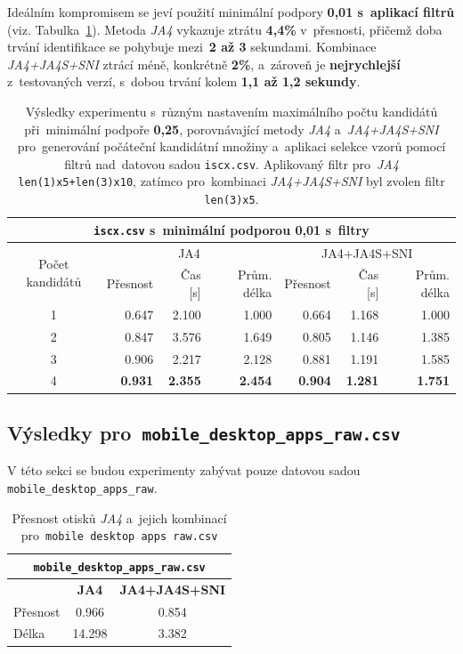 Ideálním kompromisem se jeví použití minimální podpory \textbf{0,01 s~aplikací filtrů} (viz. Tabulka~\ref{tab:iscx_sup_01_filters}). Metoda \textit{JA4} vykazuje ztrátu\textbf{ 4{,}4\%} v~přesnosti, přičemž doba trvání identifikace se pohybuje mezi~\textbf{2 až 3} sekundami. Kombinace \textit{JA4+JA4S+SNI} ztrácí méně, konkrétně \textbf{2\%}, a~zároveň je \textbf{nejrychlejší} z~testovaných verzí, s~dobou trvání kolem \textbf{1{,}1 až 1{,}2 sekundy}.
\begin{table}[H]
	\centering
	\begin{tabular}{c|rrr|rrr}
		\toprule
		\multicolumn{7}{c}{\texttt{iscx.csv} s~minimální podporou 0{,}01 s~filtry}  \\
		\midrule
		\multirow{2}{*}{Počet kandidátů} & \multicolumn{3}{c}{JA4} & \multicolumn{3}{c}{JA4+JA4S+SNI}\\
		  & Přesnost & Čas [s] & Prům. délka & Přesnost & Čas [s] & Prům. délka \\
		\midrule
		1 & 0.647     & 2.100    & 1.000         & 0.664     & 1.168    & 1.000         \\
		2 & 0.847     & 3.576    & 1.649         & 0.805     & 1.146    & 1.385         \\
		3 & 0.906     & 2.217    & 2.128         & 0.881     & 1.191    & 1.585         \\
		4 & \textbf{0.931}     & \textbf{2.355}    & \textbf{2.454}         & \textbf{0.904}     & \textbf{1.281}    & \textbf{1.751}         \\
		\bottomrule
	\end{tabular}
	\caption{Výsledky experimentu s~různým nastavením maximálního počtu kandidátů při~minimální podpoře \textbf{0{,}25}, porovnávající metody \textit{JA4} a~\textit{JA4+JA4S+SNI} pro~generování počáteční kandidátní množiny a~aplikaci selekce vzorů pomocí filtrů nad~datovou sadou \texttt{iscx.csv}. Aplikovaný filtr pro~\textit{JA4} \texttt{len(1)x5+len(3)x10}, zatímco pro~kombinaci \textit{JA4+JA4S+SNI} byl zvolen filtr \texttt{len(3)x5}.}
	\label{tab:iscx_sup_01_filters}
\end{table}


\subsection{Výsledky pro~\texttt{mobile\_desktop\_apps\_raw.csv}}
V této sekci se budou experimenty zabývat pouze datovou sadou \texttt{mobile\_desktop\_apps\_raw}.
\begin{table}[H]
	\centering
	\begin{tabular}{lcc}
		\toprule
		\multicolumn{3}{c}{\texttt{mobile\_desktop\_apps\_raw.csv}} \\
		\midrule
		          & \textbf{JA4} & \textbf{JA4+JA4S+SNI} \\
		\midrule
		Přesnost & 0.966        & 0.854                 \\
		Délka    & 14.298       & 3.382                 \\
		\bottomrule
	\end{tabular}
	\caption{Přesnost otisků \textit{JA4} a~jejich kombinací pro~\texttt{mobile desktop apps raw.csv}}
	\label{tab:mobile-fingerprints-accuracy}
\end{table} 

